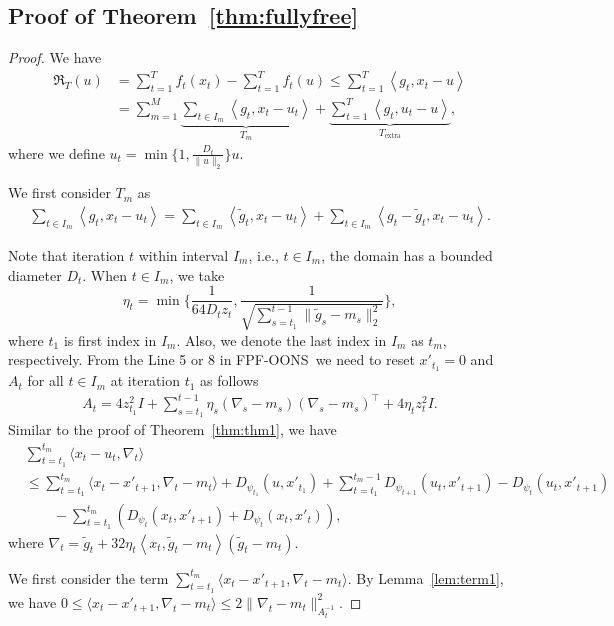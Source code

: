 \documentclass{article}
\theoremstyle{plain}
\theoremstyle{definition}
\theoremstyle{remark}
\newcommand{\fpfons}{{\sc FPF-OONS}}
\newcommand{\regret}{\mathfrak{R}}
\newcommand{\inner}[2]{\left\langle #1, #2 \right\rangle}
\renewcommand{\tilde}{\widetilde}
\begin{document}
\subsection{Proof of Theorem~\ref{thm:fullyfree}}
\begin{proof}
We have
\begin{align*}
\regret_T(u)&=\sum_{t=1}^T f_t(x_t) - \sum_{t=1}^T f_t(u) \leq \sum_{t=1}^T \inner{g_t}{x_t - u}\nonumber \\
&= \sum_{m=1}^M \underbrace{\sum_{t \in I_m} \inner{g_t}{x_t - u_t}}_{T_m} + \underbrace{\sum_{t =1}^T \inner{g_t}{u_t - u}}_{T_{\text{extra}}},
\end{align*}
where we define $u_t = \min\{ 1, \frac{D_t}{\| u \|_2} \} u$.

We first consider $T_m$ as
\begin{align*}
    \sum_{t \in I_m} \inner{g_t}{x_t - u_t} = \sum_{t \in I_m} \inner{\tilde{g}_t}{x_t - u_t} + \sum_{t \in I_m} \inner{g_t - \tilde{g}_t}{x_t - u_t}.
\end{align*}

Note that iteration $t$ within interval $I_m$, i.e., $t\in I_m$, the domain has a bounded diameter $D_t$. When $t\in I_m$, we take 
\begin{equation*}
\eta_t = \min\{\frac{1}{64 D_t z_t}, \frac{1}{\sqrt{\sum_{s=t_1}^{t-1}\| \tilde{g}_s - m_s \|_2^2}} \}, 
\end{equation*}
where $t_1$ is first index in $I_m$. Also, we denote the last index in $I_m$ as $t_m$, respectively. From the Line 5 or 8 in \fpfons\, we need to reset $x'_{t_1}=0$ and $A_t$ for all $t\in I_m$ at iteration $t_1$ as follows
\begin{align*}
    A_t = 4z_{t_1}^2 I + \sum_{s=t_1}^{t-1} \eta_s(\nabla_s - m_s)(\nabla_s - m_s)^\top + 4\eta_t z_t^2 I.
\end{align*}
Similar to the proof of Theorem~\ref{thm:thm1}, we have
\begin{align*}
&\sum_{t=t_1}^{t_m} \langle x_t-u_t,\nabla_t\rangle\\
&\leq \sum_{t=t_1}^{t_m} \langle x_{t}-x'_{t+1},\nabla_t-m_t\rangle+D_{\psi_{t_1}}(u,x'_{t_1})+\sum_{t=t_1}^{t_m-1}D_{\psi_{t+1}}(u_t,x'_{t+1})-D_{\psi_t}(u_t,x'_{t+1})\\
&\qquad-\sum_{t=t_1}^{t_m}(D_{\psi_t}(x_t,x'_{t+1})+D_{\psi_t}(x_t,x'_{t})),
\end{align*}
where $\nabla_t=\tilde{g}_t + 32\eta_t\inner{x_t}{\tilde{g}_t-m_t}(\tilde{g}_t-m_t)$.

We first consider the term $\sum_{t=t_1}^{t_m}\langle x_{t}-x'_{t+1},\nabla_t-m_t\rangle$. By Lemma~\ref{lem:term1}, we have $0\leq\langle x_{t}-x'_{t+1},\nabla_t-m_t\rangle \leq 2\|\nabla_t-m_t\|_{A_t^{-1}}^2$. 


\end{proof}
\end{document}
